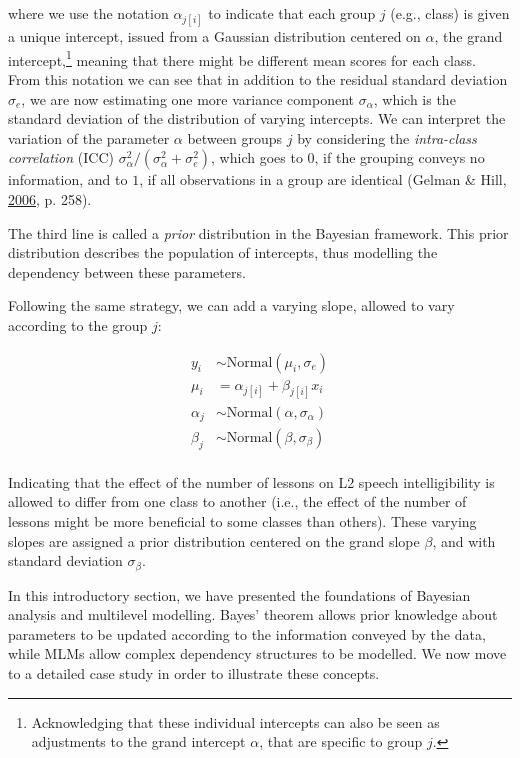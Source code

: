 \documentclass[a4paper,12pt,twoside,onecolumn,openright,final,oldfontcommands]{memoir}
\let\rmarkdownfootnote\footnote%
\def\footnote{\protect\rmarkdownfootnote}
\begin{document}
where we use the notation \(\alpha_{j[i]}\) to indicate that each group \(j\) (e.g., class) is given a unique intercept, issued from a Gaussian distribution centered on \(\alpha\), the grand intercept,\footnote{Acknowledging that these individual intercepts can also be seen as adjustments to the grand intercept \(\alpha\), that are specific to group \(j\).} meaning that there might be different mean scores for each class. From this notation we can see that in addition to the residual standard deviation \(\sigma_{e}\), we are now estimating one more variance component \(\sigma_{\alpha}\), which is the standard deviation of the distribution of varying intercepts. We can interpret the variation of the parameter \(\alpha\) between groups \(j\) by considering the \emph{intra-class correlation} (ICC) \(\sigma_{\alpha}^{2} / (\sigma_{\alpha}^{2} + \sigma_{e}^{2})\), which goes to \(0\), if the grouping conveys no information, and to \(1\), if all observations in a group are identical (Gelman \& Hill, \protect\hyperlink{ref-gelman_data_2006}{2006}, p. 258).

The third line is called a \emph{prior} distribution in the Bayesian framework. This prior distribution describes the population of intercepts, thus modelling the dependency between these parameters.

Following the same strategy, we can add a varying slope, allowed to vary according to the group \(j\):

\[
\begin{aligned}
y_{i} &\sim \mathrm{Normal}(\mu_{i}, \sigma_{e}) \\
\mu_{i} &= \alpha_{j[i]} + \beta_{j[i]} x_{i} \\
\alpha_{j} &\sim \mathrm{Normal}(\alpha, \sigma_{\alpha}) \\
\beta_{j} &\sim \mathrm{Normal}(\beta, \sigma_{\beta}) \\
\end{aligned}
\]

\vspace{5mm}

Indicating that the effect of the number of lessons on L2 speech intelligibility is allowed to differ from one class to another (i.e., the effect of the number of lessons might be more beneficial to some classes than others). These varying slopes are assigned a prior distribution centered on the grand slope \(\beta\), and with standard deviation \(\sigma_{\beta}\).

In this introductory section, we have presented the foundations of Bayesian analysis and multilevel modelling. Bayes' theorem allows prior knowledge about parameters to be updated according to the information conveyed by the data, while MLMs allow complex dependency structures to be modelled. We now move to a detailed case study in order to illustrate these concepts.
\end{document}
